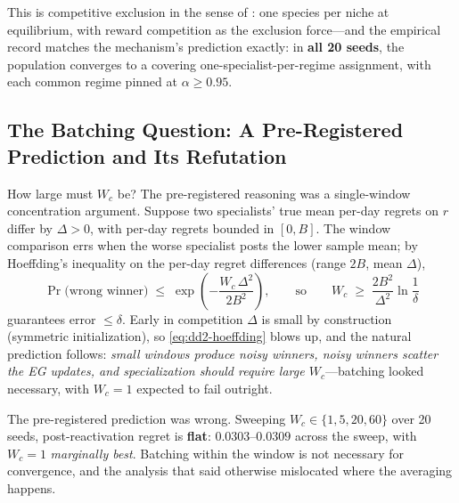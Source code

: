 \documentclass[11pt,a4paper]{article}
\theoremstyle{definition}
\theoremstyle{plain}
\begin{document}
This is competitive exclusion in the sense of \citet{li2026gause}: one
species per niche at equilibrium, with reward competition as the exclusion
force---and the empirical record matches the mechanism's prediction exactly:
in \textbf{all 20 seeds}, the population converges to a covering
one-specialist-per-regime assignment, with each common regime pinned at
$\alpha \ge 0.95$.

\subsection{The Batching Question: A Pre-Registered Prediction and Its Refutation}
\label{sec:dd2-batching}

How large must $W_c$ be? The pre-registered reasoning was a single-window
concentration argument. Suppose two specialists' true mean per-day regrets
on $r$ differ by $\Delta > 0$, with per-day regrets bounded in $[0, B]$. The
window comparison errs when the worse specialist posts the lower sample
mean; by Hoeffding's inequality on the per-day regret differences (range
$2B$, mean $\Delta$),
\begin{equation}
\label{eq:dd2-hoeffding}
\Pr\bigl(\text{wrong winner}\bigr)
\;\le\; \exp\!\left( - \frac{W_c\, \Delta^2}{2 B^2} \right),
\qquad \text{so} \qquad
W_c \;\ge\; \frac{2 B^2}{\Delta^2} \ln \frac{1}{\delta}
\end{equation}
guarantees error $\le \delta$. Early in competition $\Delta$ is small by
construction (symmetric initialization), so \eqref{eq:dd2-hoeffding} blows
up, and the natural prediction follows: \emph{small windows produce noisy
winners, noisy winners scatter the EG updates, and specialization should
require large $W_c$}---batching looked necessary, with $W_c = 1$ expected to
fail outright.

\begin{keypoint}[title={The empirical refutation, stated plainly}]
The pre-registered prediction was wrong. Sweeping
$W_c \in \{1, 5, 20, 60\}$ over 20 seeds, post-reactivation regret is
\textbf{flat}: $0.0303$--$0.0309$ across the sweep, with $W_c = 1$
\emph{marginally best}. Batching within the window is not necessary for
convergence, and the analysis that said otherwise mislocated where the
averaging happens.
\end{keypoint}
\end{document}
